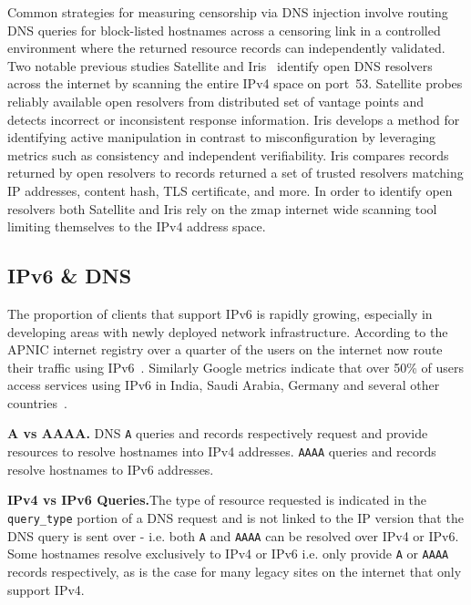 Common strategies for measuring censorship via DNS injection involve routing DNS queries for
block-listed hostnames across a censoring link in a controlled environment where
the returned resource records can independently validated. Two notable previous
studies Satellite and Iris~\cite{scott2016satellite,pearce2017global} identify
open DNS resolvers across the internet by scanning the entire IPv4 space on port~53.
Satellite probes reliably available open resolvers from distributed set of vantage
points and detects incorrect or inconsistent response information. Iris develops
a method for identifying active manipulation in contrast to misconfiguration by
leveraging metrics such as consistency and independent verifiability. Iris
compares records returned by open resolvers to records returned a set of trusted
resolvers matching IP addresses, content hash, TLS certificate, and more.
In order to identify open resolvers both Satellite and Iris rely on the zmap
internet wide scanning tool~\cite{Durumeric13zmap} limiting themselves to the IPv4 address space.

\subsection{IPv6 \& DNS}
\label{subsec:v4vsv6}

The proportion of clients that support IPv6 is rapidly growing, especially in
developing areas with newly deployed network infrastructure.
According to the APNIC internet registry over a quarter of the users
on the internet now route their traffic using IPv6~\cite{Huston-APNIC2021}.
Similarly Google metrics indicate that over 50\% of users access services using
IPv6 in India, Saudi Arabia, Germany and several other countries~\cite{Google-IPv6}.

\textbf{A vs AAAA.} DNS \texttt{A} queries and records respectively request and provide
resources to resolve hostnames into IPv4 addresses. \texttt{AAAA} queries and
records resolve hostnames to IPv6 addresses.

\textbf{IPv4 vs IPv6 Queries.}The type of resource requested is
indicated in the \texttt{query\_type} portion of a DNS request and is not linked
to the IP version that the DNS query is sent over - i.e. both \texttt{A} and
\texttt{AAAA} can be resolved over IPv4 or IPv6.
Some hostnames resolve exclusively to IPv4 or IPv6 i.e. only provide \texttt{A}
or \texttt{AAAA} records respectively, as is the case for many legacy sites on
the internet that only support IPv4.

